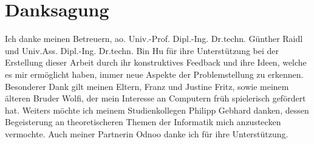 \chapter*{Danksagung}

Ich danke meinen Betreuern, ao. Univ.-Prof. Dipl.-Ing. Dr.techn. Günther Raidl und Univ.Ass. Dipl.-Ing. Dr.techn. Bin Hu für ihre Unterstützung bei der Erstellung dieser Arbeit durch ihr konstruktives Feedback und ihre Ideen, welche es mir ermöglicht haben, immer neue Aspekte der Problemstellung zu erkennen.\\

Besonderer Dank gilt meinen Eltern, Franz und Justine Fritz, sowie meinem älteren Bruder Wolfi, der mein Interesse an Computern früh spielerisch gefördert hat. Weiters möchte ich meinem Studienkollegen Philipp Gebhard danken, dessen Begeisterung an theoretischeren Themen der Informatik mich anzustecken vermochte. Auch meiner Partnerin Odnoo danke ich für ihre Unterstützung.
